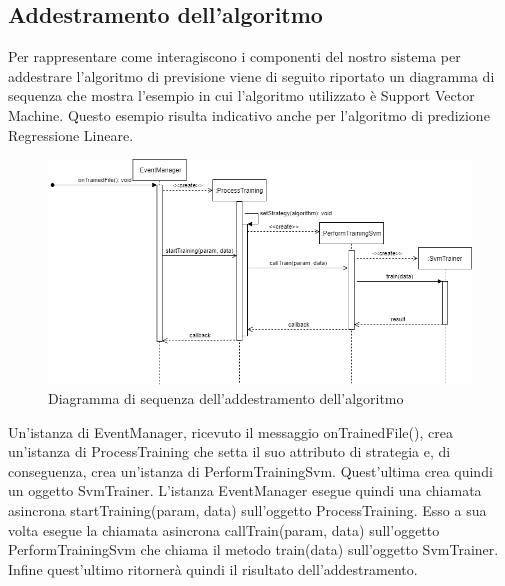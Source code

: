 	\subsection{Addestramento dell'algoritmo}
	Per rappresentare come interagiscono i componenti del nostro sistema per addestrare l'algoritmo di previsione viene di seguito riportato un diagramma di sequenza che mostra l'esempio in cui l'algoritmo utilizzato è Support Vector Machine. Questo esempio risulta indicativo anche per l'algoritmo di predizione Regressione Lineare.  
	\mbox{}
	\begin{figure} [H]
		\includegraphics[width=\linewidth]{./img/Diagrammi/ds2.png}
		\caption{Diagramma di sequenza dell'addestramento dell'algoritmo}
	\end{figure}
	Un'istanza di EventManager, ricevuto il messaggio onTrainedFile(), crea un'istanza di ProcessTraining che setta il suo attributo di strategia e, di conseguenza, crea un'istanza di PerformTrainingSvm. Quest'ultima crea quindi un oggetto SvmTrainer.
	L'istanza EventManager esegue quindi una chiamata asincrona startTraining(param, data) sull'oggetto ProcessTraining. Esso a sua volta esegue la chiamata asincrona callTrain(param, data) sull'oggetto PerformTrainingSvm che chiama il metodo train(data) sull'oggetto SvmTrainer. Infine quest'ultimo ritornerà quindi il risultato dell'addestramento.